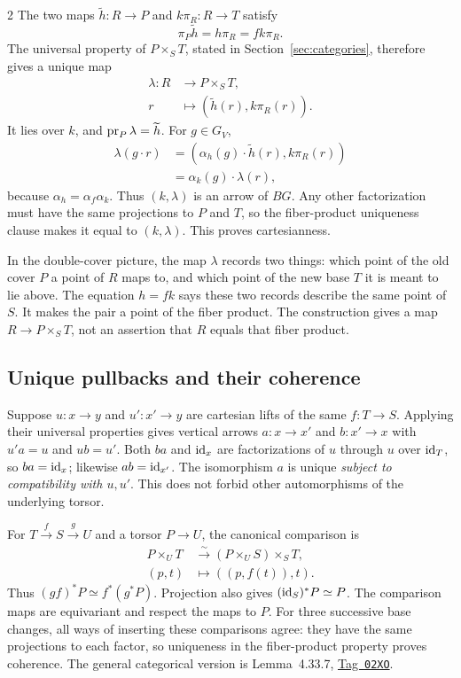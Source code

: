 \documentclass[12pt]{memoir}
\newcommand{\BGtag}[1]{\href{https://stacks.math.columbia.edu/tag/#1}{Tag~\texttt{#1}}}
\begin{document}
\begin{multicols}{2}
The two maps $\widetilde h:R\to P$ and $k\pi_R:R\to T$ satisfy
\[
 \pi_P\widetilde h=h\pi_R=fk\pi_R.
\]
The universal property of $P\times_S T$, stated in
Section~\ref{sec:categories}, therefore gives a unique map
\[
\begin{aligned}
 \lambda:R&\longrightarrow P\times_S T,\\
 r&\longmapsto(\widetilde h(r),k\pi_R(r)).
\end{aligned}
\]
It lies over $k$, and $\operatorname{pr}_P\lambda=\widetilde h$. For $g\in G_V$,
\[
\begin{aligned}
 \lambda(g\cdot r)
 &=(\alpha_h(g)\cdot\widetilde h(r),k\pi_R(r))\\
 &=\alpha_k(g)\cdot\lambda(r),
\end{aligned}
\]
because $\alpha_h=\alpha_f\alpha_k$. Thus $(k,\lambda)$ is an arrow of
$BG$. Any other factorization must have the same projections to $P$
and $T$, so the fiber-product uniqueness clause makes it equal to
$(k,\lambda)$. This proves cartesianness.

In the double-cover picture, the map $\lambda$ records two things:
which point of the old cover $P$ a point of $R$ maps to, and which
point of the new base $T$ it is meant to lie above. The equation
$h=fk$ says these two records describe the same point of $S$.
It makes the pair a point of the fiber product. The construction gives
a map $R\to P\times_S T$, not an assertion that $R$ equals that
fiber product.

\subsection{Unique pullbacks and their coherence}
Suppose $u:x\to y$ and $u':x'\to y$ are cartesian lifts of the same
$f:T\to S$. Applying their universal properties gives vertical arrows
$a:x\to x'$ and $b:x'\to x$ with $u'a=u$ and $ub=u'$.
Both $ba$ and $\operatorname{id}_x$ are factorizations of $u$ through $u$ over
$\operatorname{id}_T$, so $ba=\operatorname{id}_x$; likewise $ab=\operatorname{id}_{x'}$. The isomorphism $a$
is unique \emph{subject to compatibility with $u,u'$}. This does not
forbid other automorphisms of the underlying torsor.

For $T\xrightarrow{f}S\xrightarrow{g}U$ and a torsor $P\to U$,
the canonical comparison is
\[
\begin{aligned}
 P\times_U T&\xrightarrow{\sim}(P\times_U S)\times_S T,\\
 (p,t)&\longmapsto((p,f(t)),t).
\end{aligned}
\]
Thus $(gf)^*P\simeq f^*(g^*P)$. Projection also gives
$(\operatorname{id}_S)^*P\simeq P$. The comparison maps are equivariant and respect
the maps to $P$. For three successive base changes, all ways of inserting
these comparisons agree: they have the same projections to each factor,
so uniqueness in the fiber-product property proves coherence.
The general categorical version is Lemma~4.33.7, \BGtag{02XO}.


\end{multicols}
\end{document}
